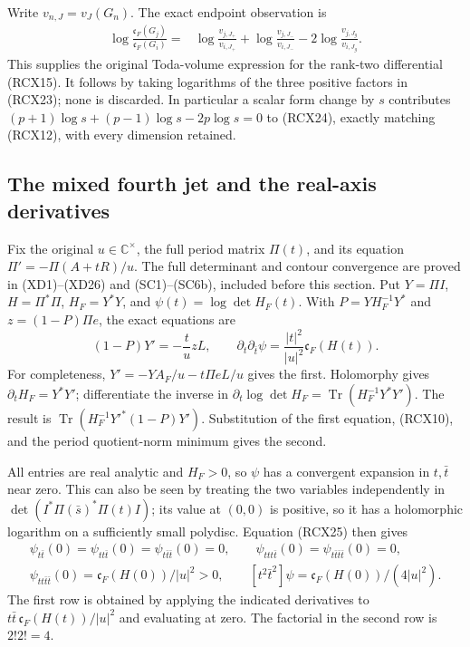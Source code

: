 \documentclass{article}
\begin{document}
Write \(v_{n,J}=v_J(G_n)\). The exact endpoint observation is
\[
\begin{split}
 \log\frac{\mathfrak c_F(G_j)}{\mathfrak c_F(G_i)}
  ={}&\log\frac{v_{j,J_+}}{v_{i,J_+}}
     +\log\frac{v_{j,J_-}}{v_{i,J_-}}
     -2\log\frac{v_{j,J_g}}{v_{i,J_g}} .
\end{split}\tag{RCX24}
\]
This supplies the original Toda-volume expression for the
rank-two differential (RCX15). It follows by taking logarithms of
the three positive factors in (RCX23); none is discarded.
In particular a scalar form change by \(s\) contributes
\((p+1)\log s+(p-1)\log s-2p\log s=0\) to (RCX24),
exactly matching (RCX12), with every dimension retained.

\subsection{The mixed fourth jet and the real-axis derivatives}

Fix the original \(u\in\mathbb C^\times\), the full period matrix
\(\Pi(t)\), and its equation \(\Pi'=-\Pi(A+tR)/u\).
The full determinant and contour convergence are proved in
(XD1)--(XD26) and (SC1)--(SC6b), included before this section.
Put \(Y=\Pi I\), \(H=\Pi^*\Pi\), \(H_F=Y^*Y\), and
\(\psi(t)=\log\det H_F(t)\). With
\(P=YH_F^{-1}Y^*\) and \(z=(1-P)\Pi e\), the exact equations are
\[
 (1-P)Y'=-\frac t u zL,\qquad
 \partial_t\partial_{\bar t}\psi
      =\frac{|t|^2}{|u|^2}\mathfrak c_F(H(t)).
 \tag{RCX25}
\]
For completeness, \(Y'=-YA_F/u-t\Pi eL/u\) gives the first.
Holomorphy gives \(\partial_tH_F=Y^*Y'\);
differentiate the inverse in
\(\partial_t\log\det H_F=\operatorname{Tr}(H_F^{-1}Y^*Y')\).
The result is
\(\operatorname{Tr}(H_F^{-1}Y'^*(1-P)Y')\).
Substitution of the first equation, (RCX10), and the period
quotient-norm minimum gives the second.

All entries are real analytic and \(H_F>0\), so \(\psi\) has a
convergent expansion in \(t,\bar t\) near zero. This can also
be seen by treating the two variables independently in
\(\det(I^*\Pi(\bar s)^*\Pi(t)I)\); its value at \((0,0)\)
is positive, so it has a holomorphic logarithm on a sufficiently
small polydisc. Equation (RCX25) then gives
\[
\begin{gathered}
 \psi_{t\bar t}(0)=\psi_{tt\bar t}(0)
  =\psi_{t\bar t\bar t}(0)=0,\qquad
 \psi_{ttt\bar t}(0)=\psi_{t\bar t\bar t\bar t}(0)=0,\\
 \boxed{\psi_{tt\bar t\bar t}(0)
       =\mathfrak c_F(H(0))/|u|^2>0,\qquad
 [t^2\bar t^2]\psi=\mathfrak c_F(H(0))/(4|u|^2).}
\end{gathered}\tag{RCX26}
\]
The first row is obtained by applying the indicated derivatives
to \(t\bar t\,\mathfrak c_F(H(t))/|u|^2\) and evaluating at zero.
The factorial in the second row is \(2!2!=4\).
\end{document}
